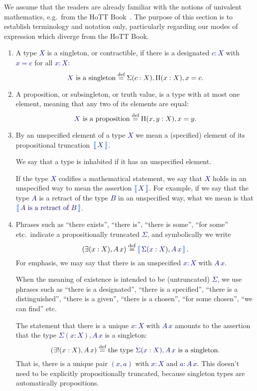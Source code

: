 \documentclass[10pt]{article}
\makeatletter
\newcommand{\db}{\textcolor{darkblue}}
\newcommand\leftcolor[2]{%
  \edef\@tempa{#1}%
  \ifx\@tempa\@empty
    \edef\@tempa{darkblue}%
  \fi
 \mathinner\bgroup\begingroup\color{\@tempa}\left#2\normalcolor%
}
\newcommand\rightcolor[2]{%
  \edef\@tempa{#1}%
  \ifx\@tempa\@empty
    \edef\@tempa{darkblue}%
  \fi
  \color{\@tempa}\right#2\endgroup\egroup%
}
\newcommand{\trunc}[1]{\leftcolor{darkgreen}\llbracket\,\db{#1}\,\rightcolor{darkgreen}\rrbracket}
\newcommand{\m}[1]{\db{$#1$}}
\newcommand{\eqdef}{\overset{\text{def}}{=}}
\theoremstyle{definition}
\makeatother
\begin{document}
We assume that the readers are already familiar with the notions of
univalent mathematics, e.g.\ from the HoTT Book~\cite{hottbook}. The
purpose of this section is to establish terminology and notation only,
particularly regarding our modes of expression which diverge from the HoTT
Book.
\begin{enumerate}
\item A type \m{X} is a singleton, or contractible, if there is a
  designated \m{c:X} with \m{x = c} for all \m{x:X}:
  \[
    \text{\m{X} is a singleton} \eqdef \Sigma (c : X), \Pi (x:X), x = c.
  \]

\item A proposition, or subsingleton, or truth value, is a type with
  at most one element, meaning that any two of its elements are
  equal:
  \[
  \text{\m{X} is a proposition} \eqdef \Pi(x,y:X), x=y.
  \]

\item
  By an unspecified element of a type \m{X} we mean a (specified)
  element of its propositional truncation~\m{\trunc{X}}.

  We say that a type is inhabited if it has an unspecified element.

  If the type \m{X} codifies a mathematical statement, we say that
  \m{X} holds in an unspecified way to mean the assertion
  \m{\trunc{X}}. For example, if we say that the type \m{A} is a
  retract of the type \m{B} in an unspecified way, what we mean is that
  \m{\trunc{\text{\m{A} is a retract of \m{B}}}}.

\item Phrases such as ``there exists'', ``there is'', ``there is some'', ``for some'' etc.\ indicate a propositionally truncated \m{\Sigma}, and symbolically we write  \[ (\exists (x:X), A \, x) \eqdef  \trunc{\Sigma (x:X), A \, x}.\]
For emphasis, we may say that there is an unspecified \m{x:X} with \m{A\,x}.

  When the meaning of existence is intended to be (untruncated)
  \m{\Sigma}, we use phrases such as ``there is a designated'', ``there
  is a specified'', ``there is a distinguished'', ``there is a given'', ``there is a chosen'', ``for some chosen'', ``we can find'' etc.

  The statement that there is a unique \m{x:X} with \m{A \, x} amounts to
  the assertion that the type \m{\Sigma (x:X), A \, x} is a singleton:
  \[
    (\exists! (x:X), A \, x) \eqdef \text{the type \m{\Sigma (x:X), A \, x} is a singleton}.
  \]
  That is, there is a unique pair \m{(x,a)} with \m{x:X} and \m{a : A\,
  x}. This doesn't need to be explicitly propositionally truncated,
  because singleton types are automatically propositions.


\end{enumerate}
\end{document}
